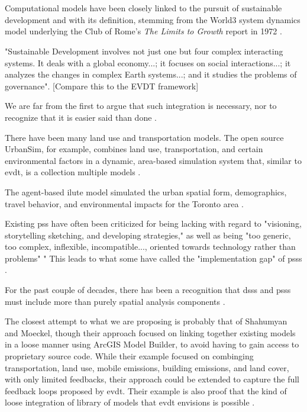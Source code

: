 \chapter{} \label{ch:evdt}

Computational models have been closely linked to the pursuit of sustainable development and with its definition, stemming from the World3 system dynamics model underlying the Club of Rome's \textit{The Limits to Growth} report in 1972 \cite{meadowsLimitsGrowth1972}.

"Sustainable Development involves not just one but four complex interacting systems. It deals with a global economy...; it focuses on social interactions...; it analyzes the changes in complex Earth systems...; and it studies the problems of governance". \cite{sachsAgeSustainableDevelopment2015} [Compare this to the EVDT framework]

We are far from the first to argue that such integration is necessary, nor to recognize that it is easier said than done \cite{shahumyanIntegrationLandUse2017}.

There have been many land use and transportation models. The open source UrbanSim, for example, combines land use, transportation, and certain environmental factors in a dynamic, area-based simulation system that, similar to \ac{evdt}, is a collection multiple models \cite{waddellUrbanSimModelingUrban2002}.

The agent-based \ac{ilute} model simulated the urban spatial form, demographics, travel behavior, and environmental impacts for the Toronto area \cite{millerHistoricalValidationIntegrated2011}.

Existing \ac{pss} have often been criticized for being lacking with regard to "visioning, storytelling sketching, and developing strategies," as well as being "too generic, too complex, inflexible, incompatible..., oriented towards technology rather than problems" \cite{brommelstroetPlanningSupportSystems2010}" This leads to what some have called the "implementation gap" of \acp{pss} \cite{BottlenecksBlockingWidespread}.

For the past couple of decades, there has been a recognition that \acp{dss} and \acp{pss} must include more than purely spatial analysis components \cite{geertmanPlanningSupportSystems2004}.

The closest attempt to what we are proposing is probably that of Shahumyan and Moeckel, though their approach focused on linking together existing models in a loose manner using ArcGIS Model Builder, to avoid having to gain access to proprietary source code. While their example focused on combinging transportation, land use, mobile emissions, building emissions, and land cover, with only limited feedbacks, their approach could be extended to capture the full feedback loops proposed by \ac{evdt}. Their example is also proof that the kind of loose integration of library of models that \ac{evdt} envisions is possible \cite{shahumyanIntegrationLandUse2017}. 

